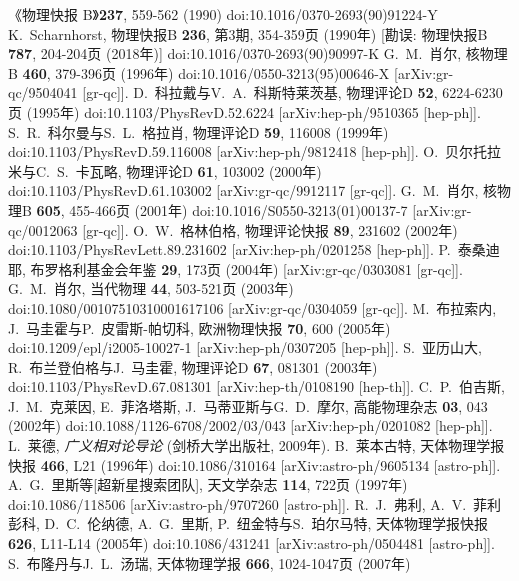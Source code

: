 \documentclass[jkps,preprint,fleqn]{revtex4}
\begin{document}
\begin{thebibliography}{999}
《物理快报 B》\textbf{237}, 559-562 (1990)
doi:10.1016/0370-2693(90)91224-Y
K.~Scharnhorst,
物理快报B \textbf{236}, 第3期, 354-359页 (1990年)
[勘误: 物理快报B \textbf{787}, 204-204页 (2018年)]
doi:10.1016/0370-2693(90)90997-K
G.~M.~肖尔,
核物理B \textbf{460}, 379-396页 (1996年)
doi:10.1016/0550-3213(95)00646-X
[arXiv:gr-qc/9504041 [gr-qc]].
D.~科拉戴与V.~A.~科斯特莱茨基,
物理评论D \textbf{52}, 6224-6230页 (1995年)
doi:10.1103/PhysRevD.52.6224
[arXiv:hep-ph/9510365 [hep-ph]].
S.~R.~科尔曼与S.~L.~格拉肖,
物理评论D \textbf{59}, 116008 (1999年)
doi:10.1103/PhysRevD.59.116008
[arXiv:hep-ph/9812418 [hep-ph]].
O.~贝尔托拉米与C.~S.~卡瓦略,
物理评论D \textbf{61}, 103002 (2000年)
doi:10.1103/PhysRevD.61.103002
[arXiv:gr-qc/9912117 [gr-qc]].
G.~M.~肖尔,
核物理B \textbf{605}, 455-466页 (2001年)
doi:10.1016/S0550-3213(01)00137-7
[arXiv:gr-qc/0012063 [gr-qc]].
O.~W.~格林伯格,
物理评论快报 \textbf{89}, 231602 (2002年)
doi:10.1103/PhysRevLett.89.231602
[arXiv:hep-ph/0201258 [hep-ph]].
P.~泰桑迪耶,
布罗格利基金会年鉴 \textbf{29}, 173页 (2004年)
[arXiv:gr-qc/0303081 [gr-qc]].
G.~M.~肖尔,
当代物理 \textbf{44}, 503-521页 (2003年)
doi:10.1080/00107510310001617106
[arXiv:gr-qc/0304059 [gr-qc]].
M.~布拉索内, J.~马圭霍与P.~皮雷斯-帕切科,
欧洲物理快报 \textbf{70}, 600 (2005年)
doi:10.1209/epl/i2005-10027-1
[arXiv:hep-ph/0307205 [hep-ph]].
S.~亚历山大, R.~布兰登伯格与J.~马圭霍,
物理评论D \textbf{67}, 081301 (2003年)
doi:10.1103/PhysRevD.67.081301
[arXiv:hep-th/0108190 [hep-th]].
C.~P.~伯吉斯, J.~M.~克莱因, E.~菲洛塔斯, J.~马蒂亚斯与G.~D.~摩尔,
高能物理杂志 \textbf{03}, 043 (2002年)
doi:10.1088/1126-6708/2002/03/043
[arXiv:hep-ph/0201082 [hep-ph]].
 L.~莱德, \textit{广义相对论导论} (剑桥大学出版社, 2009年).
B.~莱本古特,
天体物理学报快报 \textbf{466}, L21 (1996年)
doi:10.1086/310164
[arXiv:astro-ph/9605134 [astro-ph]].
A.~G.~里斯等[超新星搜索团队],
天文学杂志 \textbf{114}, 722页 (1997年)
doi:10.1086/118506
[arXiv:astro-ph/9707260 [astro-ph]].
R.~J.~弗利, A.~V.~菲利彭科, D.~C.~伦纳德, A.~G.~里斯, P.~纽金特与S.~珀尔马特,
天体物理学报快报 \textbf{626}, L11-L14 (2005年)
doi:10.1086/431241
[arXiv:astro-ph/0504481 [astro-ph]].
S.~布隆丹与J.~L.~汤瑞,
天体物理学报 \textbf{666}, 1024-1047页 (2007年)

\end{thebibliography}
\end{document}
